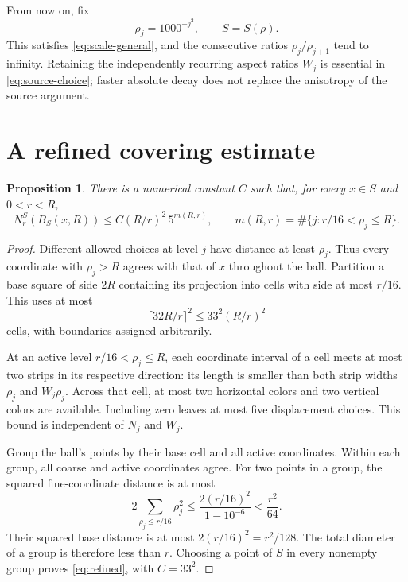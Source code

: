 \documentclass[
  11pt,
]{article}
\newtheorem{proposition}[theorem]{Proposition}
\theoremstyle{remark}\newtheorem{remark}[theorem]{Remark}
\begin{document}
From now on, fix
\begin{equation}\label{eq:superlacunary}
 \rho_j=1000^{-j^2},\qquad S=S(\rho).
\end{equation}
This satisfies \eqref{eq:scale-general}, and the consecutive ratios $\rho_j/\rho_{j+1}$ tend to infinity. Retaining the independently recurring aspect ratios $W_j$ is essential in \eqref{eq:source-choice}; faster absolute decay does not replace the anisotropy of the source argument.

\section{A refined covering estimate}\label{sec:cover}
\begin{proposition}\label{prop:refined}
There is a numerical constant $C$ such that, for every $x\in S$ and $0<r<R$,
\begin{equation}\label{eq:refined}
 N_r^S(B_S(x,R))\le C(R/r)^2\,5^{m(R,r)},
 \qquad m(R,r)=\#\{j:r/16<\rho_j\le R\}.
\end{equation}
\end{proposition}
\begin{proof}
Different allowed choices at level $j$ have distance at least $\rho_j$. Thus every coordinate with $\rho_j>R$ agrees with that of $x$ throughout the ball. Partition a base square of side $2R$ containing its projection into cells with side at most $r/16$. This uses at most
\[
 \lceil32R/r\rceil^2\le 33^2(R/r)^2
\]
cells, with boundaries assigned arbitrarily.

At an active level $r/16<\rho_j\le R$, each coordinate interval of a cell meets at most two strips in its respective direction: its length is smaller than both strip widths $\rho_j$ and $W_j\rho_j$. Across that cell, at most two horizontal colors and two vertical colors are available. Including zero leaves at most five displacement choices. This bound is independent of $N_j$ and $W_j$.

Group the ball's points by their base cell and all active coordinates. Within each group, all coarse and active coordinates agree. For two points in a group, the squared fine-coordinate distance is at most
\[
 2\sum_{\rho_j\le r/16}\rho_j^2
 \le\frac{2(r/16)^2}{1-10^{-6}}<\frac{r^2}{64}.
\]
Their squared base distance is at most $2(r/16)^2=r^2/128$. The total diameter of a group is therefore less than $r$. Choosing a point of $S$ in every nonempty group proves \eqref{eq:refined}, with $C=33^2$.
\end{proof}
\end{document}
